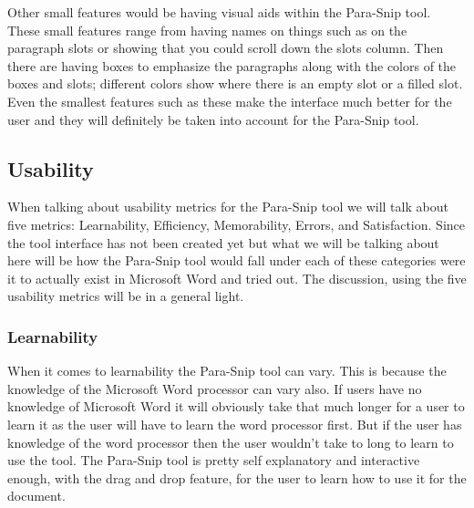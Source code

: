\documentclass{article}
\begin{document}
	Other small features would be having visual aids within the Para-Snip tool. These small features range from having names on things such as on the paragraph slots or showing that you could scroll down the slots column. Then there are having boxes to emphasize the paragraphs along with the colors of the boxes and slots; different colors show where there is an empty slot or a filled slot. Even the smallest features such as these make the interface much better for the user and they will definitely be taken into account for the Para-Snip tool.	
%
%

\subsection{Usability}
	When talking about usability metrics for the Para-Snip tool we will talk about five metrics: Learnability, Efficiency, Memorability, Errors, and Satisfaction. Since the tool interface has not been created yet but what we will be talking about here will be how the Para-Snip tool would fall under each of these categories were it to actually exist in Microsoft Word and tried out. The discussion, using the five usability metrics will be in a general light.

\subsubsection{Learnability}
	When it comes to learnability the Para-Snip tool can vary. This is because the knowledge of the Microsoft Word processor can vary also. If users have no knowledge of Microsoft Word it will obviously take that much longer for a user to learn it as the user will have to learn the word processor first. But if the user has knowledge of the word processor then the user wouldn't take to long to learn to use the tool. The Para-Snip tool is pretty self explanatory and interactive enough, with the drag and drop feature, for the user to learn how to use it for the document.
	
\end{document}
